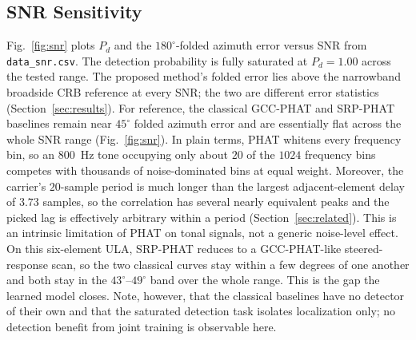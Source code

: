 \documentclass[sensors,article,submit,pdftex,moreauthors]{Definitions/mdpi}
\begin{document}
\subsection{SNR Sensitivity}
Fig.~\ref{fig:snr} plots $P_d$ and the $180^\circ$-folded azimuth error versus SNR from \texttt{data\_snr.csv}. The detection probability is fully saturated at $P_d=1.00$ across the tested range. The proposed method's folded error lies above the narrowband broadside CRB reference at every SNR; the two are different error statistics (Section~\ref{sec:results}). For reference, the classical GCC-PHAT and SRP-PHAT baselines remain near $45^\circ$ folded azimuth error and are essentially flat across the whole SNR range (Fig.~\ref{fig:snr}). In plain terms, PHAT whitens every frequency bin, so an \SI{800}{\hertz} tone occupying only about $20$ of the $1024$ frequency bins competes with thousands of noise-dominated bins at equal weight. Moreover, the carrier's $20$-sample period is much longer than the largest adjacent-element delay of $3.73$ samples, so the correlation has several nearly equivalent peaks and the picked lag is effectively arbitrary within a period (Section~\ref{sec:related}). This is an intrinsic limitation of PHAT on tonal signals, not a generic noise-level effect. On this six-element ULA, SRP-PHAT reduces to a GCC-PHAT-like steered-response scan, so the two classical curves stay within a few degrees of one another and both stay in the $43^\circ$--$49^\circ$ band over the whole range. This is the gap the learned model closes. Note, however, that the classical baselines have no detector of their own and that the saturated detection task isolates localization only; no detection benefit from joint training is observable here.
\end{document}

